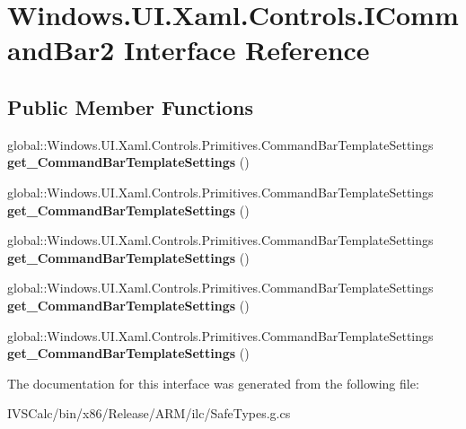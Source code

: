 \hypertarget{interface_windows_1_1_u_i_1_1_xaml_1_1_controls_1_1_i_command_bar2}{}\section{Windows.\+U\+I.\+Xaml.\+Controls.\+I\+Command\+Bar2 Interface Reference}
\label{interface_windows_1_1_u_i_1_1_xaml_1_1_controls_1_1_i_command_bar2}
\subsection*{Public Member Functions}
\begin{DoxyCompactItemize}
\item 
\mbox{\label{interface_windows_1_1_u_i_1_1_xaml_1_1_controls_1_1_i_command_bar2_a826613da8b60f95738028e20b5fc0160}} 
global\+::\+Windows.\+U\+I.\+Xaml.\+Controls.\+Primitives.\+Command\+Bar\+Template\+Settings {\bfseries get\+\_\+\+Command\+Bar\+Template\+Settings} ()
\item 
\mbox{\label{interface_windows_1_1_u_i_1_1_xaml_1_1_controls_1_1_i_command_bar2_a826613da8b60f95738028e20b5fc0160}} 
global\+::\+Windows.\+U\+I.\+Xaml.\+Controls.\+Primitives.\+Command\+Bar\+Template\+Settings {\bfseries get\+\_\+\+Command\+Bar\+Template\+Settings} ()
\item 
\mbox{\label{interface_windows_1_1_u_i_1_1_xaml_1_1_controls_1_1_i_command_bar2_a826613da8b60f95738028e20b5fc0160}} 
global\+::\+Windows.\+U\+I.\+Xaml.\+Controls.\+Primitives.\+Command\+Bar\+Template\+Settings {\bfseries get\+\_\+\+Command\+Bar\+Template\+Settings} ()
\item 
\mbox{\label{interface_windows_1_1_u_i_1_1_xaml_1_1_controls_1_1_i_command_bar2_a826613da8b60f95738028e20b5fc0160}} 
global\+::\+Windows.\+U\+I.\+Xaml.\+Controls.\+Primitives.\+Command\+Bar\+Template\+Settings {\bfseries get\+\_\+\+Command\+Bar\+Template\+Settings} ()
\item 
\mbox{\label{interface_windows_1_1_u_i_1_1_xaml_1_1_controls_1_1_i_command_bar2_a826613da8b60f95738028e20b5fc0160}} 
global\+::\+Windows.\+U\+I.\+Xaml.\+Controls.\+Primitives.\+Command\+Bar\+Template\+Settings {\bfseries get\+\_\+\+Command\+Bar\+Template\+Settings} ()
\end{DoxyCompactItemize}


The documentation for this interface was generated from the following file\+:\begin{DoxyCompactItemize}
\item 
I\+V\+S\+Calc/bin/x86/\+Release/\+A\+R\+M/ilc/Safe\+Types.\+g.\+cs\end{DoxyCompactItemize}
